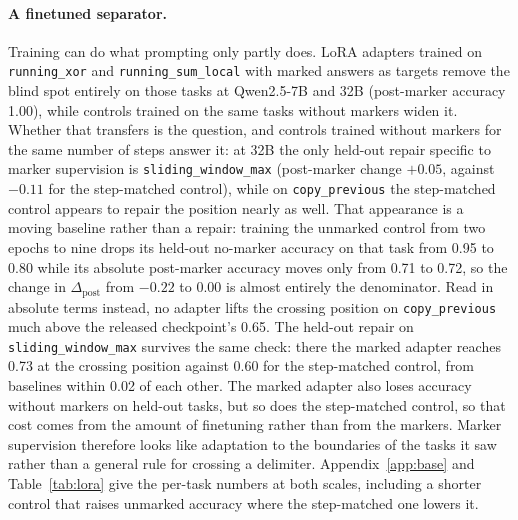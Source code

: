 \documentclass[10pt]{article} %
\newcommand{\task}[1]{\texttt{#1}}
\begin{document}
\paragraph{A finetuned separator.} Training can do what prompting only partly does. LoRA adapters trained on \task{running\_xor} and \task{running\_sum\_local} with marked answers as targets remove the blind spot entirely on those tasks at Qwen2.5-7B and 32B (post-marker accuracy 1.00), while controls trained on the same tasks without markers widen it. Whether that transfers is the question, and controls trained without markers for the same number of steps answer it: at 32B the only held-out repair specific to marker supervision is \task{sliding\_window\_max} (post-marker change $+0.05$, against $-0.11$ for the step-matched control), while on \task{copy\_previous} the step-matched control appears to repair the position nearly as well. That appearance is a moving baseline rather than a repair: training the unmarked control from two epochs to nine drops its held-out no-marker accuracy on that task from 0.95 to 0.80 while its absolute post-marker accuracy moves only from 0.71 to 0.72, so the change in $\Delta_{\text{post}}$ from $-0.22$ to $0.00$ is almost entirely the denominator. Read in absolute terms instead, no adapter lifts the crossing position on \task{copy\_previous} much above the released checkpoint's 0.65. The held-out repair on \task{sliding\_window\_max} survives the same check: there the marked adapter reaches 0.73 at the crossing position against 0.60 for the step-matched control, from baselines within 0.02 of each other. The marked adapter also loses accuracy without markers on held-out tasks, but so does the step-matched control, so that cost comes from the amount of finetuning rather than from the markers. Marker supervision therefore looks like adaptation to the boundaries of the tasks it saw rather than a general rule for crossing a delimiter. Appendix~\ref{app:base} and Table~\ref{tab:lora} give the per-task numbers at both scales, including a shorter control that raises unmarked accuracy where the step-matched one lowers it.
\end{document}
